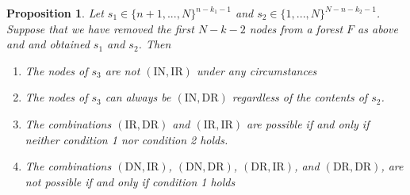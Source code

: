 \documentclass{article}
\newtheorem{proposition}{Proposition}[section]
\begin{document}
\begin{proposition}\label{p2}
Let $s_1\in\{n+1,...,N\}^{n-k_1-1}$ and $s_2\in\{1,...,N\}^{N-n-k_2-1}$. Suppose that we have removed the first $N-k-2$ nodes from a forest $F$ as above and and obtained $s_1$ and $s_2$. Then
\begin{enumerate}
    \item The nodes of $s_3$ are not $(\mathrm{IN}, \mathrm{IR})$ under any circumstances
    \item The nodes of $s_3$ can always be $(\mathrm{IN}, \mathrm{DR})$ regardless of the contents of $s_2$.
    \item The combinations $(\mathrm{IR}, \mathrm{DR})$ and $(\mathrm{IR}, \mathrm{IR})$ are possible if and only if neither condition 1 nor condition 2 holds.
    \item The combinations $(\mathrm{DN}, \mathrm{IR})$, $(\mathrm{DN}, \mathrm{DR})$, $(\mathrm{DR}, \mathrm{IR})$, and $(\mathrm{DR}, \mathrm{DR})$, are not possible if and only if condition 1 holds
\end{enumerate}
\end{proposition}
\end{document}
